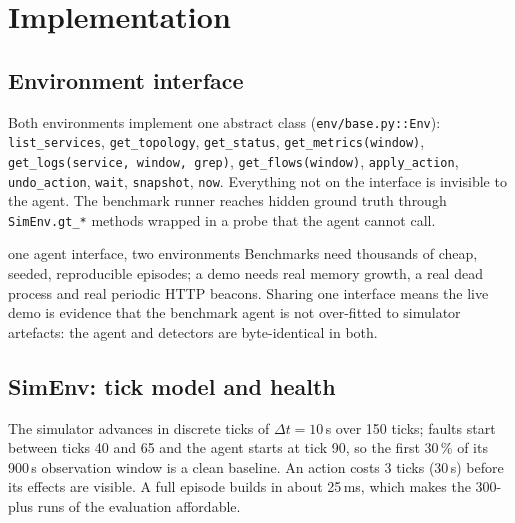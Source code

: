 \documentclass[11pt,a4paper]{article}
\newcommand{\code}[1]{\texttt{#1}}
\newcommand{\pct}[1]{#1\,\%}
\begin{document}
\section{Implementation}
\label{sec:impl}

\subsection{Environment interface}
{\sloppy Both environments implement one abstract class (\code{env/base.py::Env}): \code{list\_services},
\code{get\_topology}, \code{get\_status}, \code{get\_metrics(window)},
\code{get\_logs(service, window, grep)}, \code{get\_flows(window)}, \code{apply\_action},
\code{undo\_action}, \code{wait}, \code{snapshot}, \code{now}. Everything not on the interface is
invisible to the agent. The benchmark runner reaches hidden ground truth through
\code{SimEnv.gt\_*} methods wrapped in a probe that the agent cannot call.\par}

\begin{designdecision}{one agent interface, two environments}
Benchmarks need thousands of cheap, seeded, reproducible episodes; a demo needs real memory growth,
a real dead process and real periodic HTTP beacons. Sharing one interface means the live demo is
evidence that the benchmark agent is not over-fitted to simulator artefacts: the agent and detectors
are byte-identical in both.
\end{designdecision}

\subsection{SimEnv: tick model and health}
The simulator advances in discrete ticks of $\Delta t = 10$\,s over 150 ticks; faults start between
ticks 40 and 65 and the agent starts at tick 90, so the first \pct{30} of its 900\,s observation
window is a clean baseline. An action costs 3 ticks (30\,s) before its effects are visible. A full
episode builds in about 25\,ms, which makes the 300-plus runs of the evaluation affordable.
\end{document}
